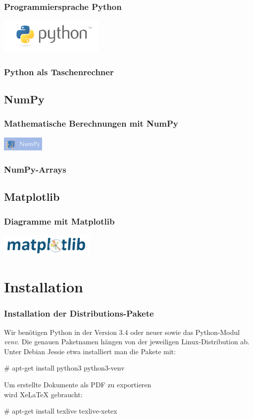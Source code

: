 \documentclass{beamer}
\begin{document}
\begin{frame}
  \frametitle{Programmiersprache Python}
  \includegraphics[width=2in]{python-logo.png}
\end{frame}

\begin{frame}
  \frametitle{Python als Taschenrechner}
\end{frame}


\subsection{NumPy}

\begin{frame}
  \frametitle{Mathematische Berechnungen mit NumPy}
  \includegraphics[width=0.8in]{numpy-logo.png}
\end{frame}

\begin{frame}
  \frametitle{NumPy-Arrays}
\end{frame}


\subsection{Matplotlib}

\begin{frame}
  \frametitle{Diagramme mit Matplotlib}
  \includegraphics[width=1.8in]{matplotlib-logo.png}
\end{frame}

\section{Installation}

\begin{frame}
  \frametitle{Installation der Distributions-Pakete}
  Wir ben\"otigen Python in der Version 3.4 oder neuer sowie das Python-Modul \emph{venv}.
  Die genauen Paketnamen h\"angen von der jeweiligen Linux-Distribution ab.
  Unter Debian Jessie etwa installiert man die Pakete mit:
  \begin{semiverbatim}
    \# apt-get install python3 python3-venv
  \end{semiverbatim}
  Um erstellte Dokumente als PDF zu exportieren \\ wird XeLaTeX gebraucht:
  \begin{semiverbatim}
    \# apt-get install texlive texlive-xetex
  \end{semiverbatim}
\end{frame}
\end{document}
